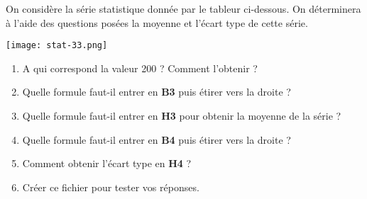 
On considère la série statistique donnée par le tableur ci-dessous. On déterminera à l'aide des questions posées la moyenne et l'écart type de cette série.

\begin{center}
\texttt{[image: stat-33.png]}
\end{center}


\begin{enumerate}
\item A qui correspond la valeur 200 ? Comment l'obtenir ?
\item Quelle formule faut-il entrer en \textbf{B3} puis étirer vers la droite ?
\item Quelle formule faut-il entrer en \textbf{H3} pour obtenir la moyenne de la série ?
\item Quelle formule faut-il entrer en \textbf{B4} puis étirer vers la droite ?
\item Comment obtenir l'écart type en \textbf{H4} ?
\item Créer ce fichier pour tester vos réponses.
\end{enumerate} 